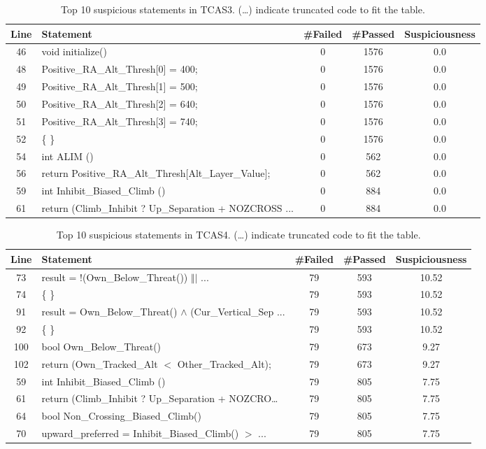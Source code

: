 \documentclass[conference]{IEEEtran}
\begin{document}
\label{appendix:TCAS3}
\begin{table}[h]
    \centering
    \footnotesize
    \begin{tabular}{|c|p{2.8cm}|c|c|c|}
        \hline
        \textbf{Line} & \textbf{Statement} & \#Failed & \#Passed & \textbf{Suspiciousness} \\
        \hline
         46 & void initialize() & 0 & 1576 & 0.0 \\
         48 & Positive\_RA\_Alt\_Thresh[0] = 400; & 0 & 1576 & 0.0 \\
         49 & Positive\_RA\_Alt\_Thresh[1] = 500; & 0 & 1576 & 0.0 \\
         50 & Positive\_RA\_Alt\_Thresh[2] = 640; & 0 & 1576 & 0.0 \\
         51 & Positive\_RA\_Alt\_Thresh[3] = 740; & 0 & 1576 & 0.0 \\
         52 & \{ \} & 0 & 1576 & 0.0 \\
         54 & int ALIM () & 0 & 562 & 0.0 \\
         56 & return Positive\_RA\_Alt\_Thresh[Alt\_Layer\_Value]; & 0 & 562 & 0.0 \\
         59 & int Inhibit\_Biased\_Climb () & 0 & 884 & 0.0 \\
         61 & return (Climb\_Inhibit ? Up\_Separation + NOZCROSS ... & 0 & 884 & 0.0 \\
        \hline
    \end{tabular}
    \caption{Top 10 suspicious statements in TCAS3. (\dots) indicate truncated code to fit the table.}
\end{table}

\label{appendix:TCAS4}
\begin{table}[h]
    \centering
    \footnotesize
    \begin{tabular}{|c|p{3cm}|c|c|c|}
        \hline
        \textbf{Line} & \textbf{Statement} & \#Failed & \#Passed & \textbf{Suspiciousness} \\
        \hline
         73 & result = !(Own\_Below\_Threat()) $\Vert\vert$ ... & 79 & 593 & 10.52 \\
         74 & \{ \} & 79 & 593 & 10.52 \\
         91 & result = Own\_Below\_Threat() $\land$ (Cur\_Vertical\_Sep ... & 79 & 593 & 10.52 \\
         92 & \{ \} & 79 & 593 & 10.52 \\
         100 & bool Own\_Below\_Threat() & 79 & 673 & 9.27 \\
         102 & return (Own\_Tracked\_Alt $<$ Other\_Tracked\_Alt); & 79 & 673 & 9.27 \\
         59 & int Inhibit\_Biased\_Climb () & 79 & 805 & 7.75 \\
         61 & return (Climb\_Inhibit ? Up\_Separation + NOZCRO\dots & 79 & 805 & 7.75 \\
         64 & bool Non\_Crossing\_Biased\_Climb() & 79 & 805 & 7.75 \\
         70 & upward\_preferred = Inhibit\_Biased\_Climb() $>$ ... & 79 & 805 & 7.75 \\
        \hline
    \end{tabular}
    \caption{Top 10 suspicious statements in TCAS4. (\dots) indicate truncated code to fit the table.}
\end{table}
\end{document}
